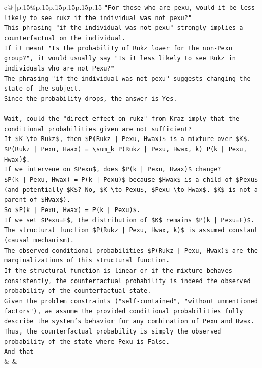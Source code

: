 \documentclass{article}
\begin{document}
{\begin{supertabular}{c@{$\;$}|p{.15\linewidth}@{}p{.15\linewidth}p{.15\linewidth}p{.15\linewidth}p{.15\linewidth}p{.15\linewidth}}
{{{\texttt{"For those who are pexu, would it be less likely to see rukz if the individual was not pexu?"} \\
\texttt{This phrasing "if the individual was not pexu" strongly implies a counterfactual on the individual.} \\
\texttt{If it meant "Is the probability of Rukz lower for the non{-}Pexu group?", it would usually say "Is it less likely to see Rukz in individuals who are not Pexu?"} \\
\texttt{The phrasing "if the individual was not pexu" suggests changing the state of the subject.} \\
\texttt{Since the probability drops, the answer is Yes.} \\
\\ 
\texttt{Wait, could the "direct effect on rukz" from Kraz imply that the conditional probabilities given are not sufficient?} \\
\texttt{If \$K \textbackslash{}to Rukz\$, then \$P(Rukz | Pexu, Hwax)\$ is a mixture over \$K\$.} \\
\texttt{\$P(Rukz | Pexu, Hwax) = \textbackslash{}sum\_k P(Rukz | Pexu, Hwax, k) P(k | Pexu, Hwax)\$.} \\
\texttt{If we intervene on \$Pexu\$, does \$P(k | Pexu, Hwax)\$ change?} \\
\texttt{\$P(k | Pexu, Hwax) = P(k | Pexu)\$ because \$Hwax\$ is a child of \$Pexu\$ (and potentially \$K\$? No, \$K \textbackslash{}to Pexu\$, \$Pexu \textbackslash{}to Hwax\$. \$K\$ is not a parent of \$Hwax\$).} \\
\texttt{So \$P(k | Pexu, Hwax) = P(k | Pexu)\$.} \\
\texttt{If we set \$Pexu=F\$, the distribution of \$K\$ remains \$P(k | Pexu=F)\$.} \\
\texttt{The structural function \$P(Rukz | Pexu, Hwax, k)\$ is assumed constant (causal mechanism).} \\
\texttt{The observed conditional probabilities \$P(Rukz | Pexu, Hwax)\$ are the marginalizations of this structural function.} \\
\texttt{If the structural function is linear or if the mixture behaves consistently, the counterfactual probability is indeed the observed probability of the counterfactual state.} \\
\texttt{Given the problem constraints ("self{-}contained", "without unmentioned factors"), we assume the provided conditional probabilities fully describe the system's behavior for any combination of Pexu and Hwax.} \\
\texttt{Thus, the counterfactual probability is simply the observed probability of the state where Pexu is False.} \\
\texttt{And that} \\
            }
        }
    }
    & & \\ \\


\end{supertabular}}
\end{document}
